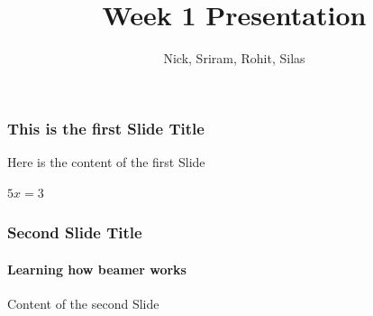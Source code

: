 \documentclass{beamer}
\title{Week 1 Presentation}
\author{Nick, Sriram, Rohit, Silas}
\begin{document}
    \maketitle
    \begin{frame}
        \frametitle{This is the first Slide Title}

        Here is the content of the first Slide

        $5x = 3$
    \end{frame}

    \begin{frame}
        \frametitle{Second Slide Title}
        \framesubtitle{Learning how beamer works}

        Content of the second Slide

    \end{frame}
\end{document}
